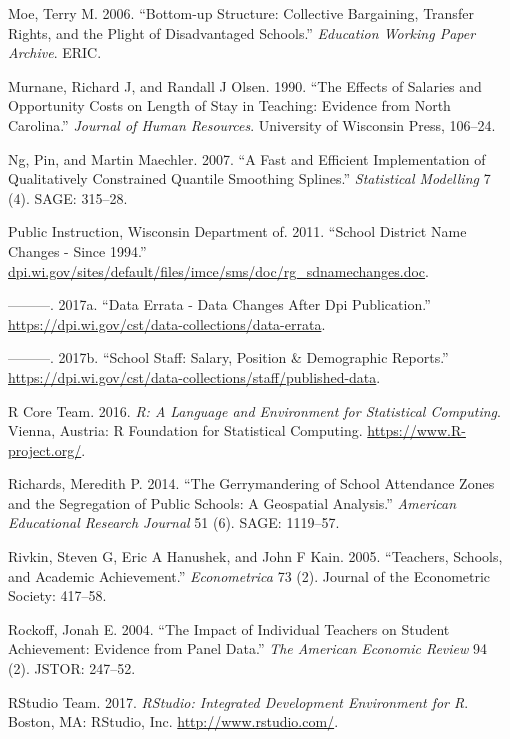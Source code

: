 \documentclass[12pt,]{article}
\begin{document}
\hypertarget{ref-moe}{}
Moe, Terry M. 2006. ``Bottom-up Structure: Collective Bargaining,
Transfer Rights, and the Plight of Disadvantaged Schools.''
\emph{Education Working Paper Archive}. ERIC.

\hypertarget{ref-murnane}{}
Murnane, Richard J, and Randall J Olsen. 1990. ``The Effects of Salaries
and Opportunity Costs on Length of Stay in Teaching: Evidence from North
Carolina.'' \emph{Journal of Human Resources}. University of Wisconsin
Press, 106--24.

\hypertarget{ref-ng}{}
Ng, Pin, and Martin Maechler. 2007. ``A Fast and Efficient
Implementation of Qualitatively Constrained Quantile Smoothing
Splines.'' \emph{Statistical Modelling} 7 (4). SAGE: 315--28.

\hypertarget{ref-dpi_name_change}{}
Public Instruction, Wisconsin Department of. 2011. ``School District
Name Changes - Since 1994.''
\url{dpi.wi.gov/sites/default/files/imce/sms/doc/rg_sdnamechanges.doc}.

\hypertarget{ref-dpi_errata}{}
---------. 2017a. ``Data Errata - Data Changes After Dpi Publication.''
\url{https://dpi.wi.gov/cst/data-collections/data-errata}.

\hypertarget{ref-dpi}{}
---------. 2017b. ``School Staff: Salary, Position \& Demographic
Reports.''
\url{https://dpi.wi.gov/cst/data-collections/staff/published-data}.

\hypertarget{ref-r}{}
R Core Team. 2016. \emph{R: A Language and Environment for Statistical
Computing}. Vienna, Austria: R Foundation for Statistical Computing.
\url{https://www.R-project.org/}.

\hypertarget{ref-richards}{}
Richards, Meredith P. 2014. ``The Gerrymandering of School Attendance
Zones and the Segregation of Public Schools: A Geospatial Analysis.''
\emph{American Educational Research Journal} 51 (6). SAGE: 1119--57.

\hypertarget{ref-rivkin}{}
Rivkin, Steven G, Eric A Hanushek, and John F Kain. 2005. ``Teachers,
Schools, and Academic Achievement.'' \emph{Econometrica} 73 (2). Journal
of the Econometric Society: 417--58.

\hypertarget{ref-rockoff}{}
Rockoff, Jonah E. 2004. ``The Impact of Individual Teachers on Student
Achievement: Evidence from Panel Data.'' \emph{The American Economic
Review} 94 (2). JSTOR: 247--52.

\hypertarget{ref-rstudio}{}
RStudio Team. 2017. \emph{RStudio: Integrated Development Environment
for R}. Boston, MA: RStudio, Inc. \url{http://www.rstudio.com/}.
\end{document}
